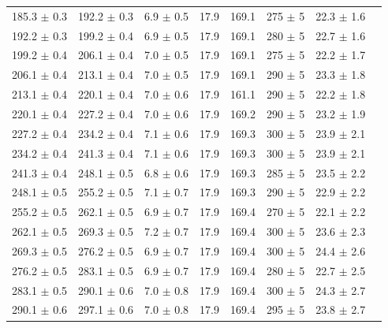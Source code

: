 \begin{table}[p]
\begin{tabular}{c c c c c c c c}
    185.3 $\pm$ 0.3 & 192.2 $\pm$ 0.3 & 6.9 $\pm$ 0.5 & 17.9 & 169.1 & 275 $\pm$ 5 & 22.3 $\pm$ 1.6 \\
    192.2 $\pm$ 0.3 & 199.2 $\pm$ 0.4 & 6.9 $\pm$ 0.5 & 17.9 & 169.1 & 280 $\pm$ 5 & 22.7 $\pm$ 1.6 \\
    199.2 $\pm$ 0.4 & 206.1 $\pm$ 0.4 & 7.0 $\pm$ 0.5 & 17.9 & 169.1 & 275 $\pm$ 5 & 22.2 $\pm$ 1.7 \\
    206.1 $\pm$ 0.4 & 213.1 $\pm$ 0.4 & 7.0 $\pm$ 0.5 & 17.9 & 169.1 & 290 $\pm$ 5 & 23.3 $\pm$ 1.8 \\
    213.1 $\pm$ 0.4 & 220.1 $\pm$ 0.4 & 7.0 $\pm$ 0.6 & 17.9 & 161.1 & 290 $\pm$ 5 & 22.2 $\pm$ 1.8 \\
    220.1 $\pm$ 0.4 & 227.2 $\pm$ 0.4 & 7.0 $\pm$ 0.6 & 17.9 & 169.2 & 290 $\pm$ 5 & 23.2 $\pm$ 1.9 \\
    227.2 $\pm$ 0.4 & 234.2 $\pm$ 0.4 & 7.1 $\pm$ 0.6 & 17.9 & 169.3 & 300 $\pm$ 5 & 23.9 $\pm$ 2.1 \\
    234.2 $\pm$ 0.4 & 241.3 $\pm$ 0.4 & 7.1 $\pm$ 0.6 & 17.9 & 169.3 & 300 $\pm$ 5 & 23.9 $\pm$ 2.1 \\
    241.3 $\pm$ 0.4 & 248.1 $\pm$ 0.5 & 6.8 $\pm$ 0.6 & 17.9 & 169.3 & 285 $\pm$ 5 & 23.5 $\pm$ 2.2 \\
    248.1 $\pm$ 0.5 & 255.2 $\pm$ 0.5 & 7.1 $\pm$ 0.7 & 17.9 & 169.3 & 290 $\pm$ 5 & 22.9 $\pm$ 2.2 \\
    255.2 $\pm$ 0.5 & 262.1 $\pm$ 0.5 & 6.9 $\pm$ 0.7 & 17.9 & 169.4 & 270 $\pm$ 5 & 22.1 $\pm$ 2.2 \\
    262.1 $\pm$ 0.5 & 269.3 $\pm$ 0.5 & 7.2 $\pm$ 0.7 & 17.9 & 169.4 & 300 $\pm$ 5 & 23.6 $\pm$ 2.3 \\
    269.3 $\pm$ 0.5 & 276.2 $\pm$ 0.5 & 6.9 $\pm$ 0.7 & 17.9 & 169.4 & 300 $\pm$ 5 & 24.4 $\pm$ 2.6 \\
    276.2 $\pm$ 0.5 & 283.1 $\pm$ 0.5 & 6.9 $\pm$ 0.7 & 17.9 & 169.4 & 280 $\pm$ 5 & 22.7 $\pm$ 2.5 \\
    283.1 $\pm$ 0.5 & 290.1 $\pm$ 0.6 & 7.0 $\pm$ 0.8 & 17.9 & 169.4 & 300 $\pm$ 5 & 24.3 $\pm$ 2.7 \\
    290.1 $\pm$ 0.6 & 297.1 $\pm$ 0.6 & 7.0 $\pm$ 0.8 & 17.9 & 169.4 & 295 $\pm$ 5 & 23.8 $\pm$ 2.7 \\
  \bottomrule
  \end{tabular}
\end{table}

